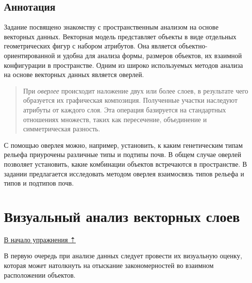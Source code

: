 \documentclass[
  12pt,
]{book}
\begin{document}
\hypertarget{overlay-annotation}{%
\subsection{Аннотация}\label{overlay-annotation}}

Задание посвящено знакомству с пространственным анализом на основе векторных данных. Векторная модель представляет объекты в виде отдельных геометрических фигур с набором атрибутов. Она является объектно-ориентированной и удобна для анализа формы, размеров объектов, их взаимной конфигурации в пространстве. Одним из широко используемых методов анализа на основе векторных данных является оверлей.

\begin{quote}
При \emph{оверлее} происходит наложение двух или более слоев, в результате чего образуется их графическая композиция. Полученные участки наследуют атрибуты от каждого слоя. Эта операция базируется на стандартных отношениях множеств, таких как пересечение, объединение и симметрическая разность.
\end{quote}

С помощью оверлея можно, например, установить, к каким генетическим типам рельефа приурочены различные типы и подтипы почв. В общем случае оверлей позволяет установить, какие комбинации объектов встречаются в пространстве. В задании предлагается исследовать методом оверлея взаимосвязь типов рельефа и типов и подтипов почв.

\hypertarget{overlay-vectors}{%
\section{Визуальный анализ векторных слоев}\label{overlay-vectors}}

\protect\hyperlink{overlay}{В начало упражнения ⇡}

В первую очередь при анализе данных следует провести их визуальную оценку, которая может натолкнуть на отыскание закономерностей во взаимном расположении объектов.
\end{document}
